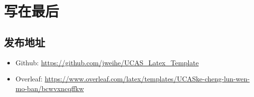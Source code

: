 \section{写在最后}
\subsection{发布地址}
\begin{itemize}
    \item Github: \url{https://github.com/jweihe/UCAS_Latex_Template}
    \item Overleaf:  \url{https://www.overleaf.com/latex/templates/UCASke-cheng-lun-wen-mo-ban/bcwvxncqffkw}
\end{itemize}